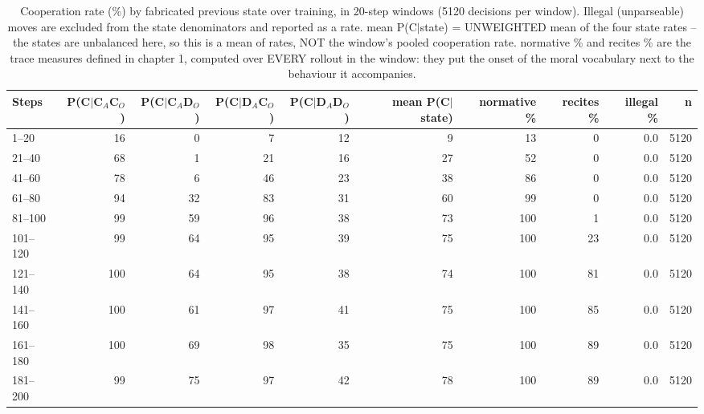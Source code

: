 \begin{table}[t]
\centering
\caption{Cooperation rate (\%) by fabricated previous state over training, in 20-step windows (5120 decisions per window). Illegal (unparseable) moves are excluded from the state denominators and reported as a rate. mean P(C$\mid$state) = UNWEIGHTED mean of the four state rates -- the states are unbalanced here, so this is a mean of rates, NOT the window's pooled cooperation rate. normative \% and recites \% are the trace measures defined in chapter 1, computed over EVERY rollout in the window: they put the onset of the moral vocabulary next to the behaviour it accompanies.}
\label{tab:trajectory-qwen3_8b_sdpo_pd_deon_tft_200_seed1}
\small
\setlength{\tabcolsep}{3.5pt}
\begin{tabular}{lrrrrrrrrr}
\toprule
Steps & P(C$\mid$C$_A$C$_O$) & P(C$\mid$C$_A$D$_O$) & P(C$\mid$D$_A$C$_O$) & P(C$\mid$D$_A$D$_O$) & mean P(C$\mid$state) & normative \% & recites \% & illegal \% & n \\
\midrule
1–20 & 16 & 0 & 7 & 12 & 9 & 13 & 0 & 0.0 & 5120 \\
21–40 & 68 & 1 & 21 & 16 & 27 & 52 & 0 & 0.0 & 5120 \\
41–60 & 78 & 6 & 46 & 23 & 38 & 86 & 0 & 0.0 & 5120 \\
61–80 & 94 & 32 & 83 & 31 & 60 & 99 & 0 & 0.0 & 5120 \\
81–100 & 99 & 59 & 96 & 38 & 73 & 100 & 1 & 0.0 & 5120 \\
101–120 & 99 & 64 & 95 & 39 & 75 & 100 & 23 & 0.0 & 5120 \\
121–140 & 100 & 64 & 95 & 38 & 74 & 100 & 81 & 0.0 & 5120 \\
141–160 & 100 & 61 & 97 & 41 & 75 & 100 & 85 & 0.0 & 5120 \\
161–180 & 100 & 69 & 98 & 35 & 75 & 100 & 89 & 0.0 & 5120 \\
181–200 & 99 & 75 & 97 & 42 & 78 & 100 & 89 & 0.0 & 5120 \\
\bottomrule
\end{tabular}
\end{table}
